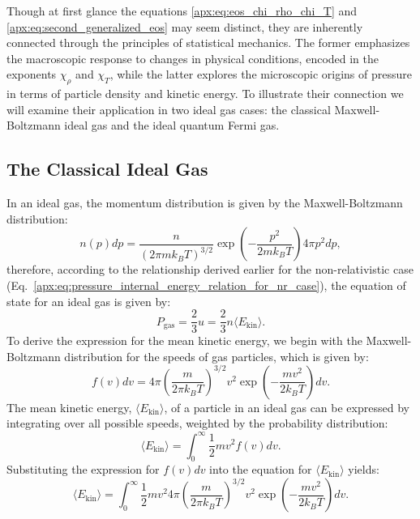 \documentclass[main.tex]{subfiles}
\begin{document}
Though at first glance the equations \eqref{apx:eq:eos_chi_rho_chi_T} and \eqref{apx:eq:second_generalized_eos} may seem distinct, they are inherently connected through the principles of statistical mechanics. The former emphasizes the macroscopic response to changes in physical conditions, encoded in the exponents $\chi_\rho$ and $\chi_T$, while the latter explores the microscopic origins of pressure in terms of particle density and kinetic energy. To illustrate their connection we will examine their application in two ideal gas cases: the classical Maxwell-Boltzmann ideal gas and the ideal quantum Fermi gas.

\subsection{The Classical Ideal Gas}
In an ideal gas, the momentum distribution is given by the Maxwell-Boltzmann distribution:
\begin{equation}
    n(p) dp = \frac{n}{(2\pi m k_BT)^{3/2}} \exp\left(- \frac{p^2}{2mk_BT}\right) 4\pi p^2 dp,
\end{equation}
therefore, according to the relationship derived earlier for the non-relativistic case (Eq.~\ref{apx:eq:pressure_internal_energy_relation_for_nr_case}), the equation of state for an ideal gas is given by:
\begin{equation}\label{apx:eq:pgas}
    P_{\text{gas}} = \frac{2}{3}u = \frac{2}{3} n \langle E_{\text{kin}} \rangle.
\end{equation}
To derive the expression for the mean kinetic energy, we begin with the Maxwell-Boltzmann distribution for the speeds of gas particles, which is given by:
\begin{equation*}
    f(v)dv = 4\pi \left( \frac{m}{2\pi k_BT} \right)^{3/2} v^2 \exp\left(-\frac{mv^2}{2k_BT}\right)dv.
\end{equation*}
The mean kinetic energy, $\langle E_{\text{kin}} \rangle$, of a particle in an ideal gas can be expressed by integrating over all possible speeds, weighted by the probability distribution:
\begin{equation*}
    \langle E_{\text{kin}} \rangle = \int_{0}^{\infty} \frac{1}{2} m v^2 f(v) dv.
\end{equation*}
Substituting the expression for $f(v)dv$ into the equation for $\langle E_{\text{kin}} \rangle$ yields:
\begin{equation*}
    \langle E_{\text{kin}} \rangle = \int_{0}^{\infty} \frac{1}{2} m v^2 4\pi \left( \frac{m}{2\pi k_BT} \right)^{3/2} v^2 \exp\left(-\frac{mv^2}{2k_BT}\right) dv.
\end{equation*}
\end{document}
